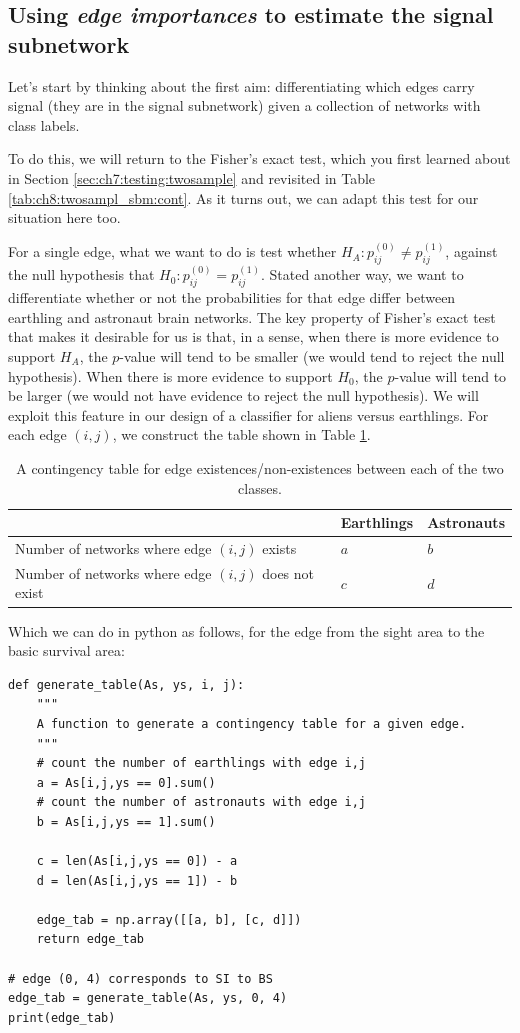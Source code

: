\subsection{Using \textit{edge importances} to estimate the signal subnetwork}

Let's start by thinking about the first aim: differentiating which edges carry signal (they are in the signal subnetwork) given a collection of networks with class labels. 

To do this, we will return to the Fisher's exact test, which you first learned about in Section \ref{sec:ch7:testing:twosample} and revisited in Table \ref{tab:ch8:twosampl_sbm:cont}. 
As it turns out, we can adapt this test for our situation here too.

For a single edge, what we want to do is test whether $H_A: p_{ij}^{(0)} \neq p_{ij}^{(1)}$, against the null hypothesis that $H_0: p_{ij}^{(0)} = p_{ij}^{(1)}$. Stated another way, we want to differentiate whether or not the probabilities for that edge differ between earthling and astronaut brain networks. The key property of Fisher's exact test that makes it desirable for us is that, in a sense, when there is more evidence to support $H_A$, the $p$-value will tend to be smaller (we would tend to reject the null hypothesis). When there is more evidence to support $H_0$, the $p$-value will tend to be larger (we would not have evidence to reject the null hypothesis). We will exploit this feature in our design of a classifier for aliens versus earthlings. For each edge $(i, j)$, we construct the table shown in Table \ref{tab:ch9:ssn:fet}.

\begin{table}[]
    \centering
    \begin{tabular}{p{4cm} | p{3cm} | p{3cm}}
         & Earthlings & Astronauts  \\
        \hline
         Number of networks where edge $(i, j)$ exists & $a$ & $b$ \\
         Number of networks where edge $(i, j)$ does not exist & $c$ & $d$ \\
         \hline
    \end{tabular}
    \caption{A contingency table for edge existences/non-existences between each of the two classes.}
    \label{tab:ch9:ssn:fet}
\end{table}

Which we can do in python as follows, for the edge from the sight area to the basic survival area:

\begin{lstlisting}[style=python]
def generate_table(As, ys, i, j):
    """
    A function to generate a contingency table for a given edge.
    """
    # count the number of earthlings with edge i,j
    a = As[i,j,ys == 0].sum()
    # count the number of astronauts with edge i,j
    b = As[i,j,ys == 1].sum()

    c = len(As[i,j,ys == 0]) - a
    d = len(As[i,j,ys == 1]) - b
    
    edge_tab = np.array([[a, b], [c, d]])
    return edge_tab

# edge (0, 4) corresponds to SI to BS
edge_tab = generate_table(As, ys, 0, 4)
print(edge_tab)
\end{lstlisting}

